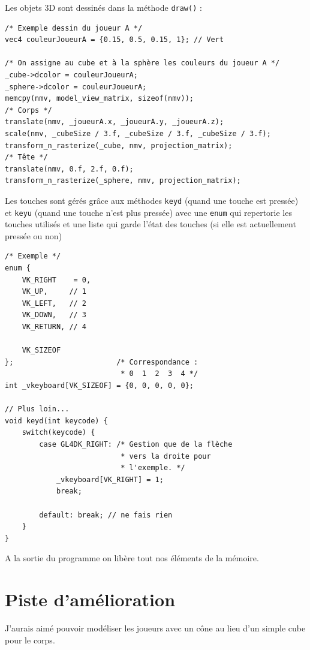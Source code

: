\documentclass{article}
\begin{document}
    Les objets 3D sont dessinés dans la méthode \texttt{draw()} :
    \begin{center}\begin{minipage}{0.9\textwidth}
        \begin{verbatim}
/* Exemple dessin du joueur A */
vec4 couleurJoueurA = {0.15, 0.5, 0.15, 1}; // Vert

/* On assigne au cube et à la sphère les couleurs du joueur A */
_cube->dcolor = couleurJoueurA;
_sphere->dcolor = couleurJoueurA;
memcpy(nmv, model_view_matrix, sizeof(nmv));
/* Corps */
translate(nmv, _joueurA.x, _joueurA.y, _joueurA.z);
scale(nmv, _cubeSize / 3.f, _cubeSize / 3.f, _cubeSize / 3.f);
transform_n_rasterize(_cube, nmv, projection_matrix);
/* Tête */
translate(nmv, 0.f, 2.f, 0.f);
transform_n_rasterize(_sphere, nmv, projection_matrix);
        \end{verbatim}
    \end{minipage}\end{center}
    \vspace{10pt}

    Les touches sont gérés grâce aux méthodes \texttt{keyd} (quand une touche est pressée) et \texttt{keyu} (quand une touche n'est plus pressée) avec une \texttt{enum} qui repertorie les touches utilisés et une liste qui garde l'état des touches (si elle est actuellement pressée ou non)
    \begin{center}\begin{minipage}{0.9\textwidth}
        \begin{verbatim}
/* Exemple */
enum {
    VK_RIGHT    = 0,
    VK_UP,     // 1
    VK_LEFT,   // 2
    VK_DOWN,   // 3
    VK_RETURN, // 4

    VK_SIZEOF
};                        /* Correspondance :
                           * 0  1  2  3  4 */
int _vkeyboard[VK_SIZEOF] = {0, 0, 0, 0, 0};

// Plus loin...
void keyd(int keycode) {
    switch(keycode) {
        case GL4DK_RIGHT: /* Gestion que de la flèche
                           * vers la droite pour
                           * l'exemple. */
            _vkeyboard[VK_RIGHT] = 1;
            break;

        default: break; // ne fais rien
    }
}
        \end{verbatim}
    \end{minipage}\end{center}
    \vspace{10pt}

    A la sortie du programme on libère tout nos éléments de la mémoire.

    \section{Piste d'amélioration}
    J'aurais aimé pouvoir modéliser les joueurs avec un cône au lieu d'un simple cube pour le corps.
\end{document}
